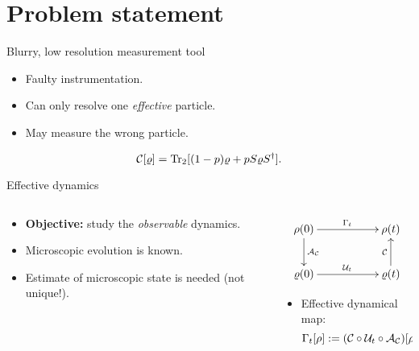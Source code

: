 \section{Problem statement}

\begin{frame}{Blurry, low resolution measurement tool}
    \begin{itemize}
        \item Faulty instrumentation.
        \item Can only resolve one \textit{effective } particle.
        \item May measure the wrong particle.
    \end{itemize}
    \begin{equation*}
        \mathcal{C}[\varrho]=\Tr_{2}[(1-p)\varrho+pS\varrho S^{\dag}].
    \end{equation*}
\end{frame}

\begin{frame}{Effective dynamics}
    \begin{columns}
        \begin{column}{0.5\textwidth}
            \begin{itemize}
                \item \textbf{Objective:} study the \textit{observable} dynamics.
                \item Microscopic evolution is known.
                \item Estimate of microscopic state is needed (not unique!). 
            \end{itemize}
        \end{column}
        \begin{column}{0.5\textwidth}
            \begin{displaymath}
                \xymatrix{
                  {\rho(0)} \ar[rr]^{\Gamma_{t}} \ar[d]^{\mcA_{\mcC}}
                  && {\rho(t)}\\
                  {\varrho(0)} \ar[rr]^{\mcU_{t}}
                  && {\varrho(t)} \ar[u]^{\mcC}
                }
              \end{displaymath}
              \begin{itemize}
              \item Effective dynamical map:
                \begin{equation*}
                    \Gamma_t[\rho]:=(\mathcal{C} \circ \mathcal{U}_t \circ \mathcal{A}_{\mathcal{C}})[\rho].
                \end{equation*}
            \end{itemize}
        \end{column}
    \end{columns}
\end{frame}